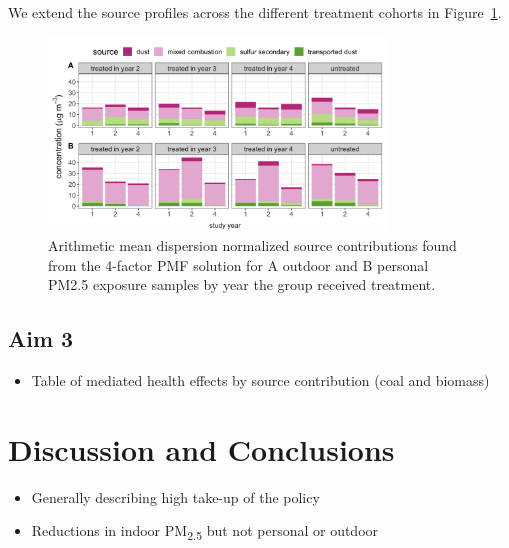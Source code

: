 \documentclass[
  letterpaper,
  DIV=11,
  numbers=noendperiod]{scrartcl}
\providecommand{\tightlist}{%
  \setlength{\itemsep}{0pt}\setlength{\parskip}{0pt}}\usepackage{longtable,booktabs,array}
\begin{document}
We extend the source profiles across the different treatment cohorts in
Figure~\ref{fig-source-season}.

\begin{figure}[H]

{\centering \includegraphics[width=0.8\textwidth,height=\textheight]{images/source-season.png}

}

\caption{\label{fig-source-season}Arithmetic mean dispersion normalized
source contributions found from the 4-factor PMF solution for A outdoor
and B personal PM2.5 exposure samples by year the group received
treatment.}

\end{figure}

\hypertarget{aim-3}{%
\subsection{Aim 3}\label{aim-3}}

\begin{itemize}
\tightlist
\item
  Table of mediated health effects by source contribution (coal and
  biomass)
\end{itemize}

\hypertarget{discussion-and-conclusions}{%
\section{Discussion and Conclusions}\label{discussion-and-conclusions}}

\begin{itemize}
\tightlist
\item
  Generally describing high take-up of the policy
\item
  Reductions in indoor PM\textsubscript{2.5} but not personal or outdoor
\end{itemize}
\end{document}
